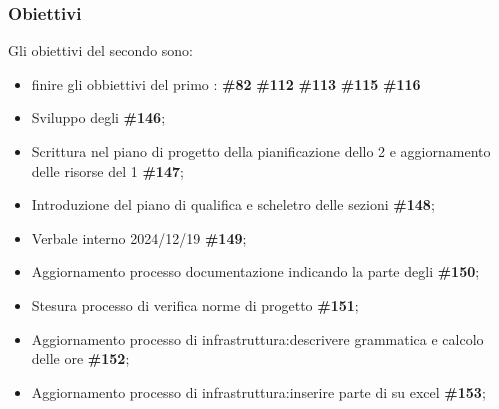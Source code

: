 \subsubsection{Obiettivi}

Gli obiettivi del secondo  sono:
\begin{itemize}
    \item finire gli obbiettivi del primo : \textbf{\#82} \textbf{\#112} \textbf{\#113} \textbf{\#115} \textbf{\#116}
    \item Sviluppo degli  \textbf{\#146};
    \item Scrittura nel piano di progetto della pianificazione dello  2 e aggiornamento delle risorse del  1 \textbf{\#147};
    \item Introduzione del piano di qualifica e scheletro delle sezioni \textbf{\#148};
    \item Verbale interno 2024/12/19 \textbf{\#149};
    \item Aggiornamento processo documentazione indicando la parte degli  \textbf{\#150};
    \item Stesura processo di verifica norme di progetto \textbf{\#151};
    \item Aggiornamento processo di infrastruttura:descrivere  grammatica e calcolo delle ore \textbf{\#152};
    \item Aggiornamento processo di infrastruttura:inserire parte di  su excel \textbf{\#153};
\end{itemize}